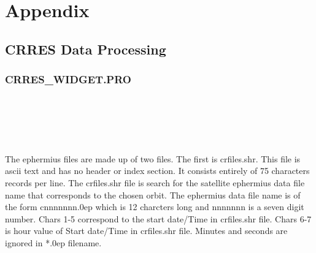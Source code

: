 \chapter{Appendix}       %
\section{CRRES Data Processing}       %
\subsection{CRRES\_WIDGET.PRO}       %
\\
\\


\\
\\


The ephermius files are made up of two files. The first is crfiles.shr. This file is ascii text and has no header or index section. It consists entirely of 75 characters records per line. The crfiles.shr file is search for the satellite ephermius data file name that corresponds to the chosen orbit. The ephermius data file name is of the form cnnnnnnn.0ep which is 12 charcters long and nnnnnnn is a seven digit number. Chars 1-5 correspond to the start date/Time in crfiles.shr file. Chars 6-7 is hour value of Start date/Time in crfiles.shr file. Minutes and seconds are ignored in *.0ep filename.\\
\newpage


